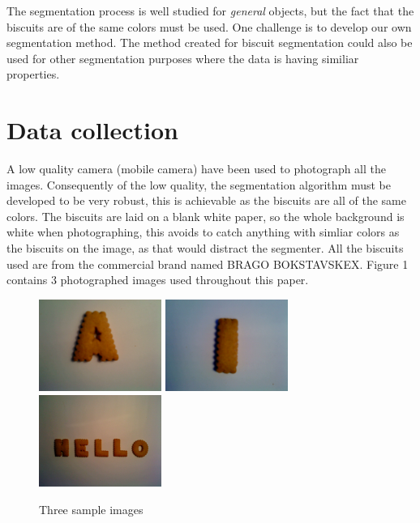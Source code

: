 \documentclass[a4paper,11pt]{article}
\begin{document}
The segmentation process is well studied for \emph{general} objects, but the fact that the biscuits are of the same colors must be used.
One challenge is to develop our own segmentation method.
The method created for biscuit segmentation could also be used for other segmentation purposes where the data is having similiar properties.

\section{Data collection}
A low quality camera (mobile camera) have been used to photograph all the images.
Consequently of the low quality, the segmentation algorithm must be developed to be very robust, this is achievable as the biscuits are all of the same colors.
The biscuits are laid on a blank white paper, so the whole background is white when photographing, this avoids to catch anything with simliar colors as the biscuits on the image, as that would distract the segmenter.
All the biscuits used are from the commercial brand named BRAGO BOKSTAVSKEX.
Figure 1 contains 3 photographed images used throughout this paper.

\begin{figure}[h]
\begin{center}
\includegraphics[width=40mm]{orig_a.JPG}
\includegraphics[width=40mm]{orig_i.JPG}
\includegraphics[width=40mm]{orig_word.JPG}

\caption{Three sample images}
\end{center}
\end{figure}
\end{document}
